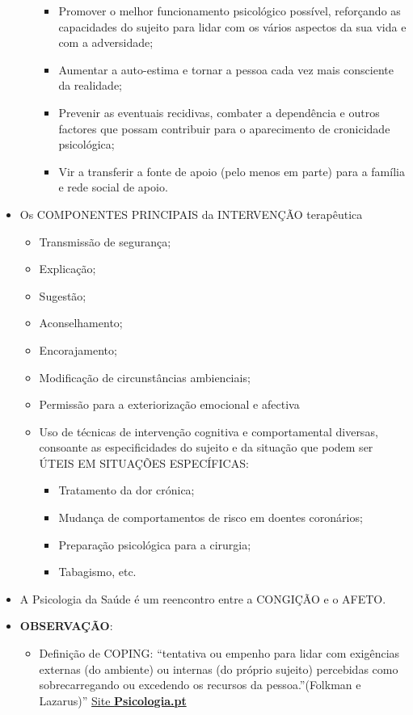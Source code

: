 \documentclass[
]{book}
\providecommand{\tightlist}{%
  \setlength{\itemsep}{0pt}\setlength{\parskip}{0pt}}
\begin{document}
\begin{itemize}
\begin{itemize}
    \begin{itemize}
    \tightlist
    \item
      Promover o melhor funcionamento psicológico possível, reforçando
      as capacidades do sujeito para lidar com os vários aspectos da sua
      vida e com a adversidade;
    \item
      Aumentar a auto-estima e tornar a pessoa cada vez mais consciente
      da realidade;
    \item
      Prevenir as eventuais recidivas, combater a dependência e outros
      factores que possam contribuir para o aparecimento de cronicidade
      psicológica;
    \item
      Vir a transferir a fonte de apoio (pelo menos em parte) para a
      família e rede social de apoio.
    \end{itemize}
  \end{itemize}
\item
  Os COMPONENTES PRINCIPAIS da INTERVENÇÃO terapêutica

  \begin{itemize}
  \tightlist
  \item
    Transmissão de segurança;
  \item
    Explicação;
  \item
    Sugestão;
  \item
    Aconselhamento;
  \item
    Encorajamento;
  \item
    Modificação de circunstâncias ambienciais;
  \item
    Permissão para a exteriorização emocional e afectiva
  \item
    Uso de técnicas de intervenção cognitiva e comportamental diversas,
    consoante as especificidades do sujeito e da situação que podem ser
    ÚTEIS EM SITUAÇÕES ESPECÍFICAS:

    \begin{itemize}
    \tightlist
    \item
      Tratamento da dor crónica;
    \item
      Mudança de comportamentos de risco em doentes coronários;
    \item
      Preparação psicológica para a cirurgia;
    \item
      Tabagismo, etc.
    \end{itemize}
  \end{itemize}
\item
  A Psicologia da Saúde é um reencontro entre a CONGIÇÃO e o AFETO.
\item
  \textbf{OBSERVAÇÃO}:

  \begin{itemize}
  \tightlist
  \item
    Definição de COPING: ``tentativa ou empenho para lidar com
    exigências externas (do ambiente) ou internas (do próprio sujeito)
    percebidas como sobrecarregando ou excedendo os recursos da
    pessoa.''(Folkman e Lazarus)''
    \href{https://www.psicologia.pt/artigos/ver_opiniao.php?codigo=AOP0216}{Site
    \textbf{Psicologia.pt}}
  \end{itemize}
\end{itemize}
\end{document}
